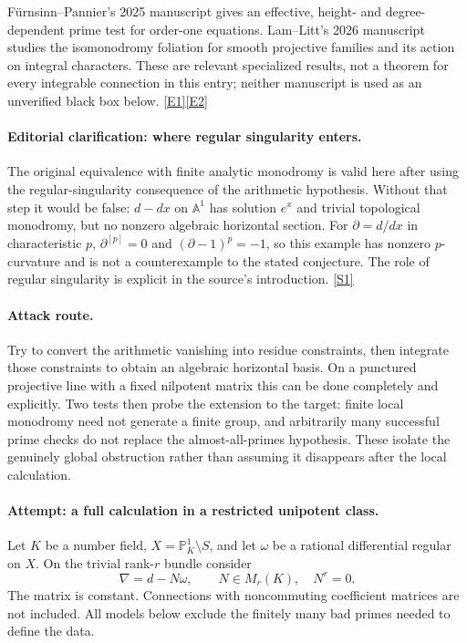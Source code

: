 \documentclass[11pt,a4paper]{article}
\newcommand{\A}{\mathbb{A}}
\newcommand{\PP}{\mathbb P}
\newcommand{\sref}[2]{\hyperlink{source:#1:#2}{[S#2]}}
\newcommand{\eref}[2]{\hyperlink{extra:#1:#2}{[E#2]}}
\numberwithin{equation}{section}
\begin{document}
F\"urnsinn--Pannier's 2025 manuscript gives an effective, height- and
degree-dependent prime test for order-one equations. Lam--Litt's 2026
manuscript studies the isomonodromy foliation for smooth projective families
and its action on integral characters. These are relevant specialized
results, not a theorem for every integrable connection in this entry;
neither manuscript is used as an unverified black box below.
\eref{30006976}{1}\eref{30006976}{2}

\paragraph{Editorial clarification: where regular singularity enters.}
The original equivalence with finite analytic monodromy is valid here after
using the regular-singularity consequence of the arithmetic hypothesis.
Without that step it would be false: $d-dx$ on $\A^1$ has solution $e^x$ and
trivial topological monodromy, but no nonzero algebraic horizontal section.
For $\partial=d/dx$ in characteristic $p$, $\partial^{[p]}=0$ and
$(\partial-1)^p=-1$, so this example has nonzero $p$-curvature and is not a
counterexample to the stated conjecture. The role of regular singularity is
explicit in the source's introduction. \sref{30006976}{1}

\paragraph{Attack route.}
Try to convert the arithmetic vanishing into residue constraints, then
integrate those constraints to obtain an algebraic horizontal basis. On a
punctured projective line with a fixed nilpotent matrix this can be done
completely and explicitly. Two tests then probe the extension to the target:
finite local monodromy need not generate a finite group, and arbitrarily
many successful prime checks do not replace the almost-all-primes
hypothesis. These isolate the genuinely global obstruction rather than
assuming it disappears after the local calculation.

\paragraph{Attempt: a full calculation in a restricted unipotent class.}
Let $K$ be a number field,
$X=\PP^1_K\setminus S$, and let $\omega$ be a rational differential regular
on $X$. On the trivial rank-$r$ bundle consider
\begin{equation}\label{30006976:unipotent}
 \nabla=d-N\omega,\qquad
 N\in M_r(K),\quad N^r=0.
\end{equation}
The matrix is constant. Connections with noncommuting coefficient matrices
are not included. All models below exclude the finitely many bad primes
needed to define the data.
\end{document}
